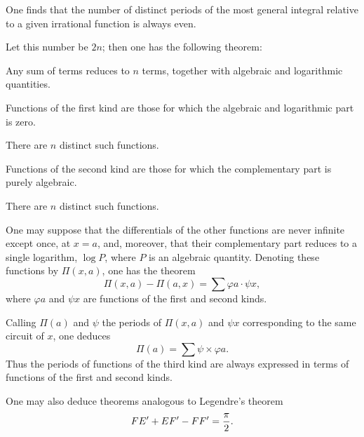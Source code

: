 One finds that the number of distinct periods of the most general
integral relative to a given irrational function is always even.

Let this number be $2n$; then one has the following theorem:

Any sum of terms reduces to $n$ terms, together with algebraic and
logarithmic quantities.

Functions of the first kind are those for which the algebraic and
logarithmic part is zero.

There are $n$ distinct such functions.

Functions of the second kind are those for which the complementary part
is purely algebraic.

There are $n$ distinct such functions.

One may suppose that the differentials of the other functions are never
infinite except once, at $x=a$, and, moreover, that their complementary
part reduces to a single logarithm, $\log P$, where $P$ is an algebraic
quantity. Denoting these functions by $\Pi(x,a)$, one has the theorem
\[
\Pi(x,a)-\Pi(a,x)=\sum \varphi a\mathbin{\cdot}\psi x,
\]
where $\varphi a$ and $\psi x$ are functions of the first and second kinds.

Calling $\Pi(a)$ and $\psi$ the periods of $\Pi(x,a)$ and $\psi x$
corresponding to the same circuit of $x$, one deduces
\[
\Pi(a)=\sum\psi\times\varphi a.
\]
Thus the periods of functions of the third kind are always expressed in
terms of functions of the first and second kinds.

One may also deduce theorems analogous to Legendre's theorem
\[
\GalWitnessVariant{FE'+EF'-FF'=\frac{\pi}{2}}{W08-WV001}.
\]


